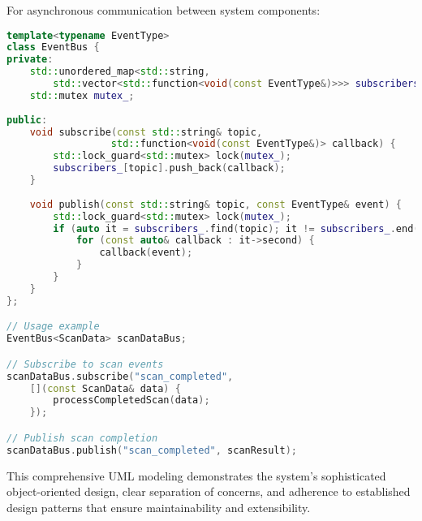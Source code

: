 For asynchronous communication between system components:

\begin{lstlisting}[language=C++, caption=Publish-Subscribe Implementation]
template<typename EventType>
class EventBus {
private:
    std::unordered_map<std::string, 
        std::vector<std::function<void(const EventType&)>>> subscribers_;
    std::mutex mutex_;
    
public:
    void subscribe(const std::string& topic, 
                  std::function<void(const EventType&)> callback) {
        std::lock_guard<std::mutex> lock(mutex_);
        subscribers_[topic].push_back(callback);
    }
    
    void publish(const std::string& topic, const EventType& event) {
        std::lock_guard<std::mutex> lock(mutex_);
        if (auto it = subscribers_.find(topic); it != subscribers_.end()) {
            for (const auto& callback : it->second) {
                callback(event);
            }
        }
    }
};

// Usage example
EventBus<ScanData> scanDataBus;

// Subscribe to scan events
scanDataBus.subscribe("scan_completed", 
    [](const ScanData& data) {
        processCompletedScan(data);
    });

// Publish scan completion
scanDataBus.publish("scan_completed", scanResult);
\end{lstlisting}

This comprehensive UML modeling demonstrates the system's sophisticated object-oriented design, clear separation of concerns, and adherence to established design patterns that ensure maintainability and extensibility.
